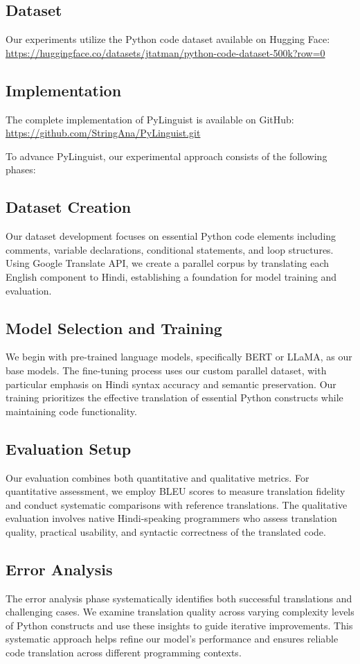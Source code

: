 \documentclass[9pt]{papertex}
\begin{document}
\subsection{Dataset}
Our experiments utilize the Python code dataset available on Hugging Face:
\url{https://huggingface.co/datasets/jtatman/python-code-dataset-500k?row=0}


\subsection{Implementation}
The complete implementation of PyLinguist is available on GitHub:
\url{https://github.com/StringAna/PyLinguist.git}

\noindent To advance PyLinguist, our experimental approach consists of the following phases:
\subsection{Dataset Creation}
Our dataset development focuses on essential Python code elements including comments, variable declarations, conditional statements, and loop structures. Using Google Translate API, we create a parallel corpus by translating each English component to Hindi, establishing a foundation for model training and evaluation.

\subsection{Model Selection and Training}
We begin with pre-trained language models, specifically BERT or LLaMA, as our base models. The fine-tuning process uses our custom parallel dataset, with particular emphasis on Hindi syntax accuracy and semantic preservation. Our training prioritizes the effective translation of essential Python constructs while maintaining code functionality.

\subsection{Evaluation Setup}
Our evaluation combines both quantitative and qualitative metrics. For quantitative assessment, we employ BLEU scores to measure translation fidelity and conduct systematic comparisons with reference translations. The qualitative evaluation involves native Hindi-speaking programmers who assess translation quality, practical usability, and syntactic correctness of the translated code.

\subsection{Error Analysis}
The error analysis phase systematically identifies both successful translations and challenging cases. We examine translation quality across varying complexity levels of Python constructs and use these insights to guide iterative improvements. This systematic approach helps refine our model's performance and ensures reliable code translation across different programming contexts.
\end{document}

